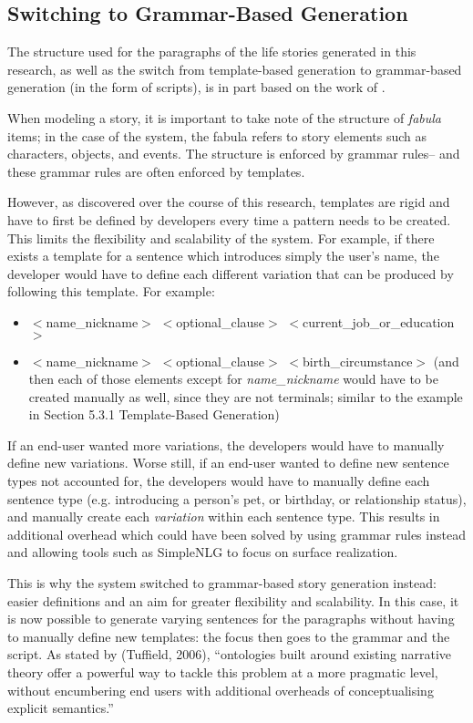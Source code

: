 \subsection{Switching to Grammar-Based Generation}
The structure used for the paragraphs of the life stories generated in this research, as well as the switch from template-based generation to grammar-based generation (in the form of scripts), is in part based on the work of \cite{Tuffield06ontologicalapproaches}.

When modeling a story, it is important to take note of the structure of \textit{fabula} items; in the case of the system, the fabula refers to story elements such as characters, objects, and events. The structure is enforced by grammar rules-- and these grammar rules are often enforced by templates.

However, as discovered over the course of this research, templates are rigid and have to first be defined by developers every time a pattern needs to be created. This limits the flexibility and scalability of the system. For example, if there exists a template for a sentence which introduces simply the user’s name, the developer would have to define each different variation that can be produced by following this template. For example:

\begin{center}
\begin{itemize}
	\item $<$name\_nickname$>$ $<$optional\_clause$>$ $<$current\_job\_or\_education$>$
	\item $<$name\_nickname$>$ $<$optional\_clause$>$ $<$birth\_circumstance$>$
	(and then each of those elements except for \textit{name\_nickname} would have to be created manually as well, since they are not terminals; similar to the example in Section 5.3.1 Template-Based Generation)
\end{itemize}
\end{center}

If an end-user wanted more variations, the developers would have to manually define new variations. Worse still, if an end-user wanted to define new sentence types not accounted for, the developers would have to manually define each sentence type (e.g. introducing a person’s pet, or birthday, or relationship status), and manually create each \textit{variation} within each sentence type. This results in additional overhead which could have been solved by using grammar rules instead and allowing tools such as SimpleNLG to focus on surface realization.

This is why the system switched to grammar-based story generation instead: easier definitions and an aim for greater flexibility and scalability. In this case, it is now possible to generate varying sentences for the paragraphs without having to manually define new templates: the focus then goes to the grammar and the script. As stated by (Tuffield, 2006), ``ontologies built around existing narrative theory offer a powerful way to tackle this problem at a more pragmatic level, without encumbering end users with additional overheads of conceptualising explicit semantics.”

